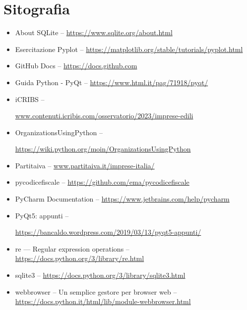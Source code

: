 \chapter*{Sitografia}



\begin{itemize}
	\item About SQLite -- 
    \url{https://www.sqlite.org/about.html}
    
    \item Esercitazione Pyplot -- 
    \url{https://matplotlib.org/stable/tutorials/pyplot.html}
    
    \item GitHub Docs -- 
    \url{https://docs.github.com}
    
    \item Guida Python - PyQt -- 
    \url{https://www.html.it/pag/71918/pyqt/}
    
    \item iCRIBS -- 
    
    \url{www.contenuti.icribis.com/osservatorio/2023/imprese-edili}
    
    \item OrganizationsUsingPython --
    
    \url{https://wiki.python.org/moin/OrganizationsUsingPython}
    
    \item Partitaiva -- 
    \url{www.partitaiva.it/imprese-italia/}
    
    \item pycodicefiscale -- 
    \url{https://github.com/ema/pycodicefiscale}
    
    \item PyCharm Documentation -- 
    \url{https://www.jetbrains.com/help/pycharm}
    
    \item PyQt5: appunti -- 
    
    \url{https://bancaldo.wordpress.com/2019/03/13/pyqt5-appunti/}
    
    \item re — Regular expression operations -- 
    \url{https://docs.python.org/3/library/re.html}
    
    \item sqlite3 -- 
    \url{https://docs.python.org/3/library/sqlite3.html}
    
    \item webbrowser -- Un semplice gestore per browser web -- 
    \url{https://docs.python.it/html/lib/module-webbrowser.html}
\end{itemize}






